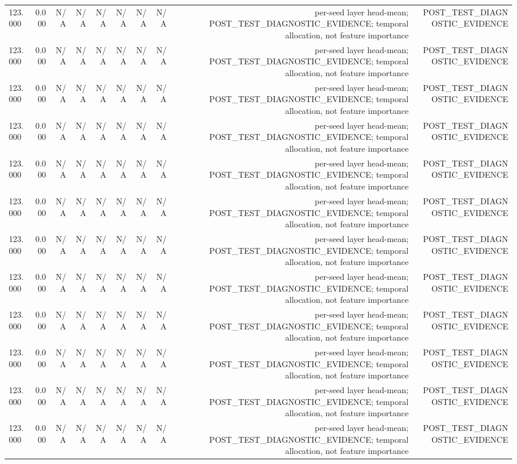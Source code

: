 \begin{table}[h!]
\begin{tabular}{lrrrrrrrrr}
123.000 & 0.000 & N/A & N/A & N/A & N/A & N/A & N/A & per-seed layer head-mean; POST\_TEST\_DIAGNOSTIC\_EVIDENCE; temporal allocation, not feature importance & POST\_TEST\_DIAGNOSTIC\_EVIDENCE \\
123.000 & 0.000 & N/A & N/A & N/A & N/A & N/A & N/A & per-seed layer head-mean; POST\_TEST\_DIAGNOSTIC\_EVIDENCE; temporal allocation, not feature importance & POST\_TEST\_DIAGNOSTIC\_EVIDENCE \\
123.000 & 0.000 & N/A & N/A & N/A & N/A & N/A & N/A & per-seed layer head-mean; POST\_TEST\_DIAGNOSTIC\_EVIDENCE; temporal allocation, not feature importance & POST\_TEST\_DIAGNOSTIC\_EVIDENCE \\
123.000 & 0.000 & N/A & N/A & N/A & N/A & N/A & N/A & per-seed layer head-mean; POST\_TEST\_DIAGNOSTIC\_EVIDENCE; temporal allocation, not feature importance & POST\_TEST\_DIAGNOSTIC\_EVIDENCE \\
123.000 & 0.000 & N/A & N/A & N/A & N/A & N/A & N/A & per-seed layer head-mean; POST\_TEST\_DIAGNOSTIC\_EVIDENCE; temporal allocation, not feature importance & POST\_TEST\_DIAGNOSTIC\_EVIDENCE \\
123.000 & 0.000 & N/A & N/A & N/A & N/A & N/A & N/A & per-seed layer head-mean; POST\_TEST\_DIAGNOSTIC\_EVIDENCE; temporal allocation, not feature importance & POST\_TEST\_DIAGNOSTIC\_EVIDENCE \\
123.000 & 0.000 & N/A & N/A & N/A & N/A & N/A & N/A & per-seed layer head-mean; POST\_TEST\_DIAGNOSTIC\_EVIDENCE; temporal allocation, not feature importance & POST\_TEST\_DIAGNOSTIC\_EVIDENCE \\
123.000 & 0.000 & N/A & N/A & N/A & N/A & N/A & N/A & per-seed layer head-mean; POST\_TEST\_DIAGNOSTIC\_EVIDENCE; temporal allocation, not feature importance & POST\_TEST\_DIAGNOSTIC\_EVIDENCE \\
123.000 & 0.000 & N/A & N/A & N/A & N/A & N/A & N/A & per-seed layer head-mean; POST\_TEST\_DIAGNOSTIC\_EVIDENCE; temporal allocation, not feature importance & POST\_TEST\_DIAGNOSTIC\_EVIDENCE \\
123.000 & 0.000 & N/A & N/A & N/A & N/A & N/A & N/A & per-seed layer head-mean; POST\_TEST\_DIAGNOSTIC\_EVIDENCE; temporal allocation, not feature importance & POST\_TEST\_DIAGNOSTIC\_EVIDENCE \\
123.000 & 0.000 & N/A & N/A & N/A & N/A & N/A & N/A & per-seed layer head-mean; POST\_TEST\_DIAGNOSTIC\_EVIDENCE; temporal allocation, not feature importance & POST\_TEST\_DIAGNOSTIC\_EVIDENCE \\
123.000 & 0.000 & N/A & N/A & N/A & N/A & N/A & N/A & per-seed layer head-mean; POST\_TEST\_DIAGNOSTIC\_EVIDENCE; temporal allocation, not feature importance & POST\_TEST\_DIAGNOSTIC\_EVIDENCE \\

\end{tabular}
\end{table}
